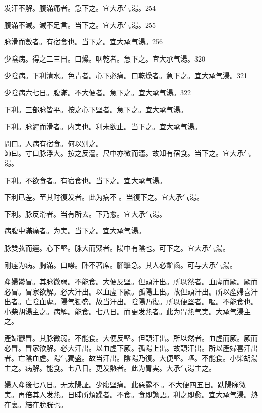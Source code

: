 发汗不解。腹滿痛者。急下之。宜{\khaaitp 大}承气湯。254

腹滿不減。減不足言。当下之。宜{\khaaitp 大}承气湯。255

脉滑而數者。有宿食也。当下之。宜{\khaaitp 大}承气湯。256

少陰病。得之二三日。口燥。咽乾者。急下之。宜{\khaaitp 大}承气湯。320

少陰病。{\khaaitp 下}利清水。色青者。心下必痛。口乾燥者。急下之。宜{\khaaitp 大}承气湯。321

少陰病六七日。腹滿。不大便者。急下之。宜{\khaaitp 大}承气湯。322

下利。三部脉皆平。按之心下堅者。急下之。宜{\khaaitp 大}承气湯。

下利。脉遲而滑者。{\khaaitp 内}実也。利未欲止。当下之。宜{\khaaitp 大}承气湯。

問曰。人病有宿食。何以別之。\\
師曰。寸口脉浮大。按之反濇。尺中亦微而濇。故知有宿食。当下之。宜{\khaaitp 大}承气湯。

下利。不欲食者。有宿食也。当下之。宜{\khaaitp 大}承气湯。

下利{\khaaitp 已}差。至其时復发者。此为病不{\sungtpii 𥁞}。当復下之。宜{\khaaitp 大}承气湯。

下利。脉反滑{\khaaitp 者}。当有所去。下乃愈。宜大承气湯。

病腹中滿痛者。为実。当下之。宜大承气湯。

脉雙弦而遲。心下堅。脉大而緊者。陽中有陰也。可下之。宜{\khaaitp 大}承气湯。

{\khaaitp 剛}痙为病。胸滿。口噤。卧不著席。腳攣急。其人必齘齒。可与大承气湯。

產婦鬱{\khaaitp 冒}。其脉微弱。不能食。大便反堅。但頭汗出。所以然者。血虗而厥。厥而必冒。冒家欲解。必大汗出。以血虗下厥。孤陽上出。故但頭汗出。所以產婦喜汗出者。亡陰血虗。陽气獨盛。故当汗出。陰陽乃復。所以便堅者。嘔。不能食也。小柴胡湯主之。病解。能食。七八日。而更发熱者。此为胃熱气実。大承气湯主之。{\wuben}

產婦鬱冒。其脉微弱。不能食。大便反堅。但頭汗出。所以然者。血虗而厥。厥而必冒。冒家欲解。必大汗出。以血虗下厥。孤陽上出。故頭汗出。所以產婦喜汗出者。亡陰血虗。陽气獨盛。故当汗出。陰陽乃復。大便堅。嘔。不能食。小柴胡湯主之。病解。能食。七八日。更发熱者。此为胃実。大承气湯主之。{\dengben}

婦人產後七八日。无太陽証。少腹堅痛。此惡露不{\sungtpii 𥁞}。不大便四五日。趺陽脉微実。再倍其人发熱。日晡所煩躁者。不食。食即譫語。利之即愈。宜大承气湯。熱在裏。結在膀胱也。{\wuben}

